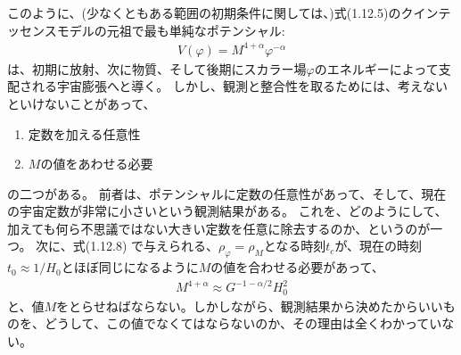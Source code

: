 \documentclass[11pt]{ltjsarticle}
\theoremstyle{plain}
\theoremstyle{break}
\begin{document}
このように、(少なくともある範囲の初期条件に関しては、)式(1.12.5)のクインテッセンスモデルの元祖で最も単純なポテンシャル:%
\begin{align}
  V(\varphi) = M^{4 + \alpha} \varphi^{-\alpha}
\end{align}%
は、初期に放射、次に物質、そして後期にスカラー場$\varphi$のエネルギーによって支配される宇宙膨張へと導く。
しかし、観測と整合性を取るためには、考えないといけないことがあって、
\begin{enumerate}
\item 定数を加える任意性
\item $M$の値をあわせる必要
\end{enumerate}%
の二つがある。
前者は、ポテンシャルに定数の任意性があって、そして、現在の宇宙定数が非常に小さいという観測結果がある。
これを、どのようにして、加えても何ら不思議ではない大きい定数を任意に除去するのか、というのが一つ。
次に、式(1.12.8)%
で与えられる、$\rho_{\varphi} = \rho_{M}$となる時刻$t_c$が、現在の時刻$t_0 \approx 1/H_0$とほぼ同じになるように$M$の値を合わせる必要があって、
\begin{align}
  M^{4+\alpha}  \approx G^{-1 - \alpha/2} H_0^2
\end{align}%
と、値$M$をとらせねばならない。しかしながら、観測結果から決めたからいいものを、どうして、この値でなくてはならないのか、その理由は全くわかっていない。
\end{document}
